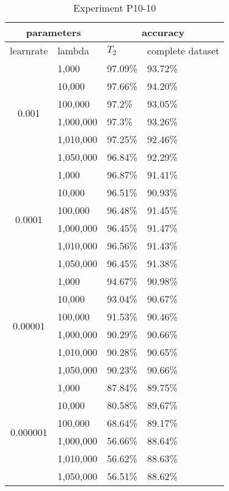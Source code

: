 \begin{table}[H]
    \centering
    \begin{tabular}{ |c|l|l|l|  }
        \hline
        \multicolumn{2}{|c|}{parameters} & \multicolumn{2}{c|}{accuracy} \\
        \hline
        learnrate & lambda & $T_2$ & complete dataset\\
        \hline
        \hline
        \multirow{6}{*}{0.001} & 1,000 & 97.09\% & 93.72\%\\
                            & 10,000 & 97.66\% & 94.20\%\\
                            & 100,000 & 97.2\% & 93.05\% \\
                            & 1,000,000 & 97.3\% & 93.26\% \\
                            & 1,010,000 & 97.25\% & 92.46\% \\
                            & 1,050,000 & 96.84\% & 92.29\% \\
        \hline
        \multirow{6}{*}{0.0001} & 1,000 & 96.87\% & 91.41\%\\
                                & 10,000 & 96.51\% & 90.93\%\\
                                & 100,000 & 96.48\% & 91.45\% \\
                                & 1,000,000 & 96.45\% & 91.47\% \\
                                & 1,010,000 & 96.56\% & 91.43\% \\
                                & 1,050,000 & 96.45\% & 91.38\% \\
        \hline
        \multirow{6}{*}{0.00001} & 1,000 & 94.67\% & 90.98\%\\
                                & 10,000 & 93.04\% & 90.67\%\\
                                & 100,000 & 91.53\% & 90.46\% \\
                                & 1,000,000 & 90.29\% & 90.66\% \\
                                & 1,010,000 & 90.28\% & 90.65\% \\
                                & 1,050,000 & 90.23\% & 90.66\% \\
        \hline
        \multirow{6}{*}{0.000001} & 1,000 & 87.84\% & 89.75\% \\
                                & 10,000 & 80.58\% & 89.67\% \\
                                & 100,000 & 68.64\% & 89.17\% \\
                                & 1,000,000 & 56.66\% & 88.64\% \\
                                & 1,010,000 & 56.62\% & 88.63\% \\
                                & 1,050,000 & 56.51\% & 88.62\% \\
        \hline
    \end{tabular}
    \caption{Experiment P10-10}
    \label{table:exp_d10-10}
\end{table}
